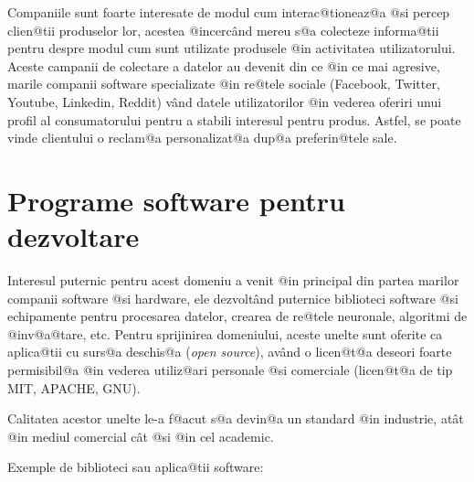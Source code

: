 	Companiile sunt foarte interesate de modul cum interac@tioneaz@a @si percep clien@tii produselor lor, acestea @incerc\^ and mereu s@a colecteze informa@tii pentru despre modul cum sunt utilizate produsele @in activitatea utilizatorului. Aceste campanii de colectare a datelor au devenit din ce @in ce mai agresive, marile companii software specializate @in re@tele sociale (Facebook, Twitter, Youtube, Linkedin, Reddit) v\^ and datele utilizatorilor @in vederea oferiri unui profil al consumatorului pentru a stabili interesul pentru produs. Astfel, se poate vinde clientului o reclam@a personalizat@a dup@a preferin@tele sale. 
	 
\section{Programe software pentru dezvoltare}

Interesul puternic pentru acest domeniu a venit @in principal din partea marilor companii software @si hardware, ele dezvolt\^ and puternice biblioteci software @si echipamente pentru procesarea datelor, crearea de re@tele neuronale, algoritmi de @inv@a@tare, etc. Pentru sprijinirea domeniului, aceste unelte sunt oferite ca aplica@tii cu surs@a deschis@a ({\sl open source}), av\^ and o licen@t@a deseori foarte permisibil@a @in vederea utiliz@ari personale @si comerciale (licen@t@a de tip MIT, APACHE, GNU).

Calitatea acestor unelte le-a f@acut s@a devin@a un standard @in industrie, at\^ at @in mediul comercial c\^ at @si @in cel academic.

Exemple de biblioteci sau aplica@tii software:

